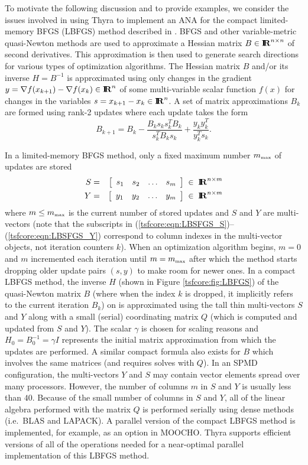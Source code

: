 \documentclass[pdf,ps2pdf,11pt]{SANDreport}
\begin{document}
To motivate the following discussion and to provide examples, we
consider the issues involved in using Thyra to implement an ANA for
the compact limited-memory BFGS (LBFGS) method described in
{}\cite{ref:byrd_et_all_lbfgs_1994}.  BFGS and other variable-metric
quasi-Newton methods are used to approximate a Hessian matrix
$B\in\RE^{n \times n}$ of second derivatives.  This approximation is
then used to generate search directions for various types of
optimization algorithms.  The Hessian matrix $B$ and/or its inverse $H
= B^{-1}$ is approximated using only changes in the gradient $y =
\nabla f(x_{k+1}) - \nabla f(x_k) \in \RE^n$ of some multi-variable scalar
function $f(x)$ for changes in the variables $s = x_{k+1} - x_k \in
\RE^n$.  A set of matrix approximations $B_k$ are formed using rank-2
updates where each update takes the form
%
\begin{equation}
B_{k+1} = B_k - \frac{B_k s_k s_k^T B_k}{s_k^T B_k s_k} + \frac{y_k y_k^T}{y_k^T s_k}.
\end{equation}

In a limited-memory BFGS method, only a fixed maximum number
$m_{\tiny\mbox{max}}$ of updates are stored
%
\begin{eqnarray}
S & = & {\bmat{cccc} s_1 & s_2 & \ldots & s_{m} \emat} \label{tsfcore:eqn:LBSFGS_S} \; \in \; \RE^{n \times m}\\
Y & = & {\bmat{cccc} y_1 & y_2 & \ldots & y_{m} \emat} \label{tsfcore:eqn:LBSFGS_Y} \; \in \; \RE^{n \times m}
\end{eqnarray}
%
where $m \le m_{\tiny\mbox{max}}$ is the current number of stored
updates and $S$ and $Y$ are multi-vectors (note that the subscripts in
(\ref{tsfcore:eqn:LBSFGS_S})--(\ref{tsfcore:eqn:LBSFGS_Y}) correspond
to column indexes in the multi-vector objects, not iteration counters
$k$).  When an optimization algorithm begins, $m=0$ and $m$
incremented each iteration until $m = m_{\tiny\mbox{max}}$ after which
the method starts dropping older update pairs $(s,y)$ to make room for
newer ones.  In a compact LBFGS method, the inverse $H$ (shown in
Figure {}\ref{tsfcore:fig:LBFGS}) of the quasi-Newton matrix $B$
(where when the index $k$ is dropped, it implicitly refers to the
current iteration $B_k$) on is approximated using the tall thin
multi-vectors $S$ and $Y$ along with a small (serial) coordinating
matrix $Q$ (which is computed and updated from $S$ and $Y$).  The
scalar $\gamma$ is chosen for scaling reasons and $H_0 = B_0^{-1} =
\gamma I$ represents the initial matrix approximation from which the
updates are performed.  A similar compact formula also exists for $B$
which involves the same matrices (and requires solves with $Q$).  In
an SPMD configuration, the multi-vectors $Y$ and $S$ may contain
vector elements spread over many processors.  However, the number of
columns $m$ in $S$ and $Y$ is usually less than $40$.  Because of the
small number of columns in $S$ and $Y$, all of the linear algebra
performed with the matrix $Q$ is performed serially using dense
methods (i.e.~BLAS and LAPACK).  A parallel version of the compact
LBFGS method is implemented, for example, as an option in MOOCHO.
Thyra supports efficient versions of all of the operations needed
for a near-optimal parallel implementation of this LBFGS method.
\end{document}
